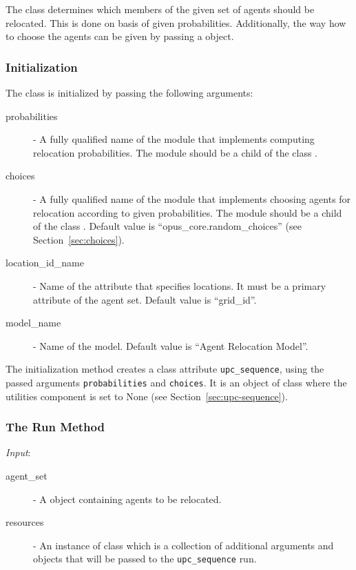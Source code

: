 The class  \modelsindex determines which members of the given
set of agents should be relocated. This is done on basis of given
probabilities. Additionally, the way how to choose the agents can be given by
passing a  object.

%
\subsubsection{Initialization}
%
The class is initialized by passing the following arguments:
\begin{description}
\item[probabilities] - A fully qualified name of the module that implements
  computing relocation probabilities. The module should be a child of the
   class .
\item[choices] - A fully qualified name of the module that implements choosing
  agents for relocation according to given probabilities. The module should be
  a child of the  class .  Default value is
  ``opus_core.random_choices'' (see Section~\ref{sec:choices}).
\item[location_id_name] - Name of the attribute \attributesindex that specifies locations. It
  must be a primary attribute \primaryattributesindex of the agent set. Default value is
  ``grid_id''.
\item[model_name] \modelsindex - Name of the model. \modelsindex Default value is ``Agent Relocation
  Model''. \modelsindex
\end{description}
The initialization method creates a class attribute \attributesindex \verb|upc_sequence|, using
the passed arguments \verb|probabilities| and \verb|choices|. It is an object
of class  where the utilities component is set to None
(see Section~\ref{sec:upc-sequence}).

%
\subsubsection{The Run Method}
%
{\it Input}:
\begin{description}
\item[agent_set] - A  \datasetindex object containing agents to be relocated.
\item[resources] - An instance of class  which is a
  collection of additional arguments and objects that will be passed to the
  \verb|upc_sequence| run.
\end{description}

